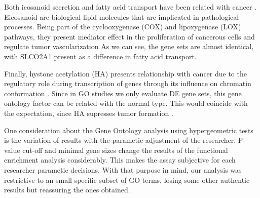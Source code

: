 \documentclass[9pt,twocolumn,twoside]{gsajnl}
\begin{document}
Both icosanoid secretion and fatty acid transport have been related with cancer \citep{fat1,fat2}. Eicosanoid are biological lipid molecules that are implicated in pathological processes. Being part of the  cyclooxygenase (COX) and lipoxygenase (LOX) pathways, they present mediator effect in the proliferation of cancerous cells and regulate tumor vascularization \citep{fatvascu} As we can see, the gene sets are almost identical, with SLCO2A1 present as a difference in fatty acid transport.

Finally, hystone acetylation (HA) presents relationship with cancer due to the regulatory role during transcription of genes through its influence on chromatin conformation \citep{histoneacet, histoneacet2, histoneacet3, histoneacet4}. Since in GO studies we only evaluate DE gene sets, this gene ontology factor can be related with the normal type. This would coincide with the expectation, since HA supresses tumor formation \cite{histonea}.


One consideration about the Gene Ontology analysis using hypergeometric tests is the variation of results with the parametic adjustment of the researcher. P-value cut-off and minimal gene sizes change the results of the functional enrichment analysis considerably. This makes the assay subjective for each researcher parametic decisions. With that purpose in mind, our analysis was restrictive to an small specific subset of GO terms, losing some other authentic results but reassuring the ones obtained.
\end{document}
